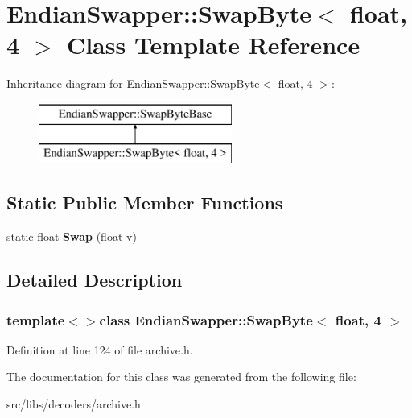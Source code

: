 \hypertarget{classEndianSwapper_1_1SwapByte_3_01float_00_014_01_4}{\section{Endian\-Swapper\-:\-:Swap\-Byte$<$ float, 4 $>$ Class Template Reference}
\label{classEndianSwapper_1_1SwapByte_3_01float_00_014_01_4}
}
Inheritance diagram for Endian\-Swapper\-:\-:Swap\-Byte$<$ float, 4 $>$\-:\begin{figure}[H]
\begin{center}
\leavevmode
\includegraphics[height=2.000000cm]{classEndianSwapper_1_1SwapByte_3_01float_00_014_01_4}
\end{center}
\end{figure}
\subsection*{Static Public Member Functions}
\begin{DoxyCompactItemize}
\item 
\hypertarget{classEndianSwapper_1_1SwapByte_3_01float_00_014_01_4_a27ae39c7361e5e738dc72d1bbe055d48}{static float {\bfseries Swap} (float v)}\label{classEndianSwapper_1_1SwapByte_3_01float_00_014_01_4_a27ae39c7361e5e738dc72d1bbe055d48}

\end{DoxyCompactItemize}


\subsection{Detailed Description}
\subsubsection*{template$<$$>$class Endian\-Swapper\-::\-Swap\-Byte$<$ float, 4 $>$}



Definition at line 124 of file archive.\-h.



The documentation for this class was generated from the following file\-:\begin{DoxyCompactItemize}
\item 
src/libs/decoders/archive.\-h\end{DoxyCompactItemize}

